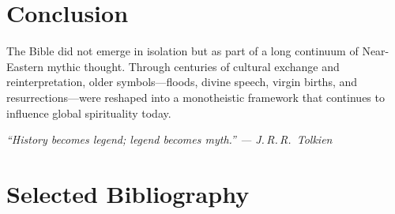 \documentclass[11pt,a4paper]{article}
\begin{document}
\section*{Conclusion}
The Bible did not emerge in isolation but as part of a long continuum of Near-Eastern mythic thought.  
Through centuries of cultural exchange and reinterpretation, older symbols—floods, divine speech, virgin births, and resurrections—were reshaped into a monotheistic framework that continues to influence global spirituality today.

\vspace{1cm}
\begin{center}
\textit{“History becomes legend; legend becomes myth.” — J.\,R.\,R.\ Tolkien}
\end{center}

\newpage
\section*{Selected Bibliography}
\end{document}
